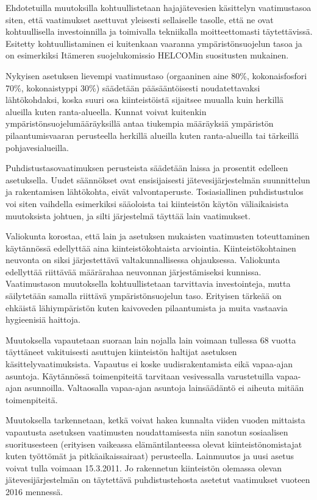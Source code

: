 Ehdotetuilla muutoksilla kohtuullistetaan hajajätevesien käsittelyn
vaatimustasoa siten, että vaatimukset asettuvat yleisesti sellaiselle
tasolle, että ne ovat kohtuullisella investoinnilla ja toimivalla
tekniikalla moitteettomasti täytettävissä. Esitetty kohtuullistaminen
ei kuitenkaan vaaranna ympäristönsuojelun tasoa ja on esimerkiksi
Itämeren suojelukomissio HELCOMin suositusten mukainen.

Nykyisen asetuksen lievempi vaatimustaso (orgaaninen aine 80\%,
kokonaisfosfori 70\%, kokonaistyppi 30\%) säädetään pääsääntöisesti
noudatettavaksi lähtökohdaksi, koska suuri osa kiinteistöistä
sijaitsee muualla kuin herkillä alueilla kuten ranta-alueella. Kunnat
voivat kuitenkin ympäristönsuojelumääräyksillä antaa tiukempia
määräyksiä ympäristön pilaantumisvaaran perusteella herkillä alueilla
kuten ranta-alueilla tai tärkeillä pohjavesialueilla.

Puhdistustasovaatimuksen perusteista säädetään laissa ja prosentit
edelleen asetuksella. Uudet säännökset ovat ensisijaisesti
jätevesijärjestelmän suunnittelun ja rakentamisen lähtökohta, eivät
valvontaperuste. Tosiasiallinen puhdistustulos voi siten vaihdella
esimerkiksi sääoloista tai kiinteistön käytön väliaikaisista
muutoksista johtuen, ja silti järjestelmä täyttää lain vaatimukset.

Valiokunta korostaa, että lain ja asetuksen mukaisten vaatimusten
toteuttaminen käytännössä edellyttää aina kiinteistökohtaista
arviointia. Kiinteistökohtainen neuvonta on siksi järjestettävä
valtakunnallisessa ohjauksessa. Valiokunta edellyttää riittävää
määrärahaa neuvonnan järjestämiseksi kunnissa.  Vaatimustason
muutoksella kohtuullistetaan tarvittavia investointeja, mutta
säilytetään samalla riittävä ympäristönsuojelun taso. Erityisen
tärkeää on ehkäistä lähiympäristön kuten kaivoveden pilaantumista ja
muita vastaavia hygieenisiä haittoja.

Muutoksella vapautetaan suoraan lain nojalla lain voimaan tullessa 68
vuotta täyttäneet vakituisesti asuttujen kiinteistön haltijat
asetuksen käsittelyvaatimuksista. Vapautus ei koske uudisrakentamista
eikä vapaa-ajan asuntoja. Käytännössä toimenpiteitä tarvitaan
vesivessalla varustetuilla vapaa-ajan asunnoilla.  Valtaosalla
vapaa-ajan asuntoja lainsäädäntö ei aiheuta mitään toimenpiteitä.

Muutoksella tarkennetaan, ketkä voivat hakea kunnalta viiden vuoden
mittaista vapautusta asetuksen vaatimusten noudattamisesta niin
sanotun sosiaalisen suoritusesteen (erityisen vaikeassa
elämäntilanteessa olevat kiinteistönomistajat kuten työttömät ja
pitkäaikaissairaat) perusteella.  Lainmuutos ja uusi asetus voivat
tulla voimaan 15.3.2011. Jo rakennetun kiinteistön olemassa olevan
jätevesijärjestelmän on täytettävä puhdistustehosta asetetut
vaatimukset vuoteen 2016 mennessä.

